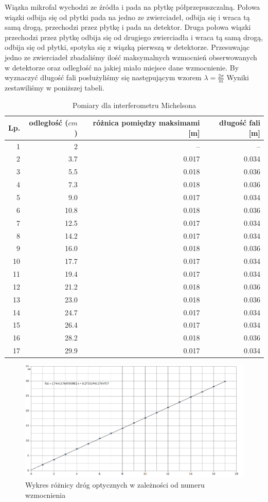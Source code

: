 \documentclass[a4paper]{article}
\begin{document}
 Wiązka mikrofal wychodzi ze źródła i pada na płytkę półprzepuszczalną. Połowa  wiązki odbija się od płytki pada na jedno ze zwierciadeł, odbija się i wraca tą samą drogą, przechodzi przez płytkę i pada na detektor.  Druga połowa wiązki przechodzi przez płytkę odbija się od drugiego zwierciadła i wraca tą samą drogą, odbija się od płytki, spotyka się z wiązką pierwszą w detektorze. Przesuwając jedno ze zwierciadeł zbadaliśmy ilość maksymalnych wzmocnień obserwowanych w detektorze oraz odległość na jakiej miało miejsce dane wzmocnienie.
By wyznaczyć długość fali posłużyliśmy się następującym wzorem $\lambda = \frac{2 \sigma}{m}$
 Wyniki zestawiliśmy w poniższej tabeli. 
\newpage
\begin{table}[h!]
\centering
\begin{tabular}{rrrr}
\toprule
Lp. &  odległość ($cm$) & różnica pomiędzy maksimami [m] & długość fali [m]\\
\midrule
1 & 2 & -- & -- \\
2 & 3.7 & 0.017 & 0.034\\
3 & 5.5 & 0.018 & 0.036\\
4 & 7.3 & 0.018 & 0.036\\
5 & 9.0 & 0.017 & 0.034\\
6 & 10.8 & 0.018 & 0.036\\
7 & 12.5 & 0.017 & 0.034\\
8 & 14.2 & 0.017 & 0.034\\
9 & 16.0 & 0.018 & 0.036\\
10 & 17.7 & 0.017 & 0.034\\
11 & 19.4 & 0.017 & 0.034\\
12 & 21.2 & 0.018 & 0.036\\
13 & 23.0 & 0.018 & 0.036\\
14 & 24.7 & 0.017 & 0.034\\
15 & 26.4 & 0.017 & 0.034\\
16 & 28.2 & 0.018 & 0.036\\
17 & 29.9 & 0.017 & 0.034\\
\bottomrule
\end{tabular}
\caption{Pomiary dla interferometru Michelsona}
\label{pomiary_michelson2}
\end{table}

\begin{figure}[h!]
\centering
\includegraphics[scale=0.6]{michelson_micro.png}
\caption{Wykres różnicy dróg optycznych w zależności od numeru wzmocnienia}
\label{michelson2}
\end{figure}
\end{document}
